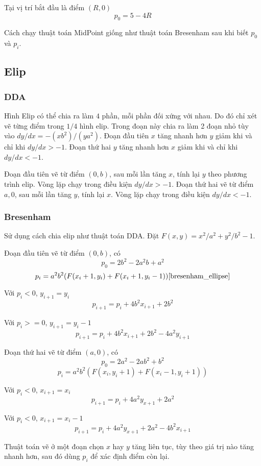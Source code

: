 \documentclass[12pt]{article}
\begin{document}
Tại vị trí bắt đầu là điểm \((R, 0)\)
\[p_0 = 5 - 4R\]

Cách chạy thuật toán MidPoint giống như thuật toán Bresenham
sau khi biết \(p_0\) và \(p_i\).

\subsection{Elip}

\subsubsection{DDA}
Hình Elip có thể chia ra làm \(4\) phần, mỗi phần đối xứng với nhau.
Do đó chỉ xét vẽ từng điểm trong \(1/4\) hình elip.
Trong đoạn này chia ra làm 2 đoạn nhỏ tùy vào \(dy/dx = -(xb^2)/(ya^2)\).
Đoạn đầu tiên \(x\) tăng nhanh hơn \(y\) giảm khi và chỉ khi \(dy/dx > -1\).
Đoạn thứ hai \(y\) tăng nhanh hơn \(x\) giảm khi và chỉ khi \(dy/dx < -1\).

Đoạn đầu tiên vẽ từ điểm \((0, b)\), sau mỗi lần tăng \(x\), tính lại \(y\) theo phương trình elip.
Vòng lặp chạy trong điều kiện \(dy/dx > -1\).
Đoạn thứ hai vẽ từ điểm \(a, 0\), sau mỗi lần tăng \(y\), tính lại \(x\).
Vòng lặp chạy trong điều kiện \(dy/dx < -1\).

\subsubsection{Bresenham}
Sử dụng cách chia elip như thuật toán DDA.
Đặt \(F(x, y) = x^2/a^2 + y^2/b^2 - 1\).

Đoạn đầu tiên vẽ từ điểm \((0, b)\), có
\[p_0 = 2b^2 - 2a^2 b + a^2\]
\[p_i = a^2 b^2 (F(x_i + 1, y_i) + F(x_i + 1, y_i - 1)) \cite{bresenham_ellipse}\]

Với \(p_i < 0\), \(y_{i+1} = y_i\)
\[p_{i+1} = p_i + 4b^2 x_{i+1} + 2b^2\]

Với \(p_i >= 0\), \(y_{i+1} = y_i - 1\)
\[p_{i+1} = p_i +  4b^2 x_{i+1} + 2b^2 - 4a^2 y_{i+1}\]

Đoạn thứ hai vẽ từ điểm \((a, 0)\), có
\[p_0 = 2a^2 - 2a b^2 + b^2\]
\[p_i = a^2 b^2 (F(x_i, y_i + 1) + F(x_i - 1, y_i + 1))\]

Với \(p_i < 0\), \(x_{i+1} = x_i\)
\[p_{i+1} = p_i + 4a^2 y_{x+1} + 2a^2\]

Với \(p_i < 0\), \(x_{i+1} = x_i - 1\)
\[p_{i+1} = p_i + 4a^2 y_{x+1} + 2a^2 - 4b^2 x_{i+1}\]

Thuật toán vẽ ở một đoạn chọn \(x\) hay \(y\) tăng liên tục,
tùy theo giá trị nào tăng nhanh hơn,
sau đó dùng \(p_i\) để xác định điểm còn lại.
\end{document}
